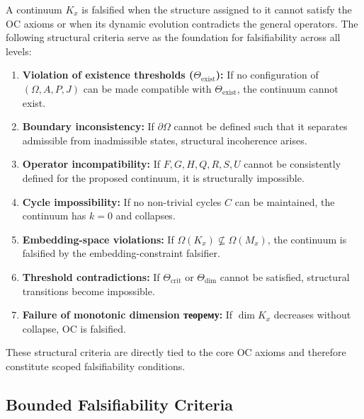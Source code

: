 A continuum $K_x$ is falsified when the structure assigned to it
cannot satisfy the OC axioms or when its dynamic evolution contradicts
the general operators.
The following structural criteria serve as the foundation for
falsifiability across all levels:

\begin{enumerate}
    \item \textbf{Violation of existence thresholds ($\Theta_{\mathrm{exist}}$):}  
          If no configuration of $(\Omega, A, P, J)$ can be made compatible
          with $\Theta_{\mathrm{exist}}$, the continuum cannot exist.

    \item \textbf{Boundary inconsistency:}  
          If $\partial\Omega$ cannot be defined such that it separates
          admissible from inadmissible states, structural incoherence arises.

    \item \textbf{Operator incompatibility:}  
          If $F, G, H, Q, R, S, U$ cannot be consistently defined for the
          proposed continuum, it is structurally impossible.

    \item \textbf{Cycle impossibility:}  
          If no non-trivial cycles $C$ can be maintained, the continuum has
          $k=0$ and collapses.

    \item \textbf{Embedding-space violations:}  
          If $\Omega(K_x) \not\subseteq \Omega(M_x)$, the continuum is
          falsified by the embedding-constraint falsifier.

    \item \textbf{Threshold contradictions:}  
          If $\Theta_{\mathrm{crit}}$ or $\Theta_{\mathrm{dim}}$ cannot be 
          satisfied, structural transitions become impossible.

    \item \textbf{Failure of monotonic dimension теорему:}  
          If $\dim K_x$ decreases without collapse, OC is falsified.
\end{enumerate}

These structural criteria are directly tied to the core OC axioms and
therefore constitute scoped falsifiability conditions.



\subsection{Bounded Falsifiability Criteria}

